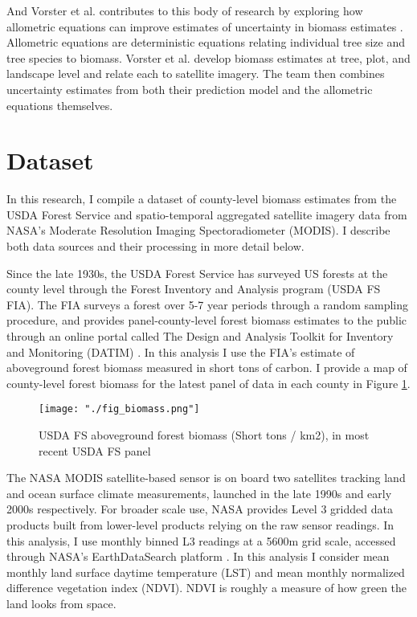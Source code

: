 \documentclass{article}
\begin{document}
And Vorster et al. contributes to this body of research by exploring how allometric equations can improve estimates of uncertainty in biomass estimates \cite{Vorster_2020}. Allometric equations are deterministic equations relating individual tree size and tree species to biomass. Vorster et al. develop biomass estimates at tree, plot, and landscape level and relate each to satellite imagery. The team then combines uncertainty estimates from both their prediction model and the allometric equations themselves. 

\section{Dataset}
\label{sec:data}

In this research, I compile a dataset of county-level biomass estimates from the USDA Forest Service and spatio-temporal aggregated satellite imagery data from NASA's Moderate Resolution Imaging Spectoradiometer (MODIS). I describe both data sources and their processing in more detail below. 

Since the late 1930s, the USDA Forest Service has surveyed US forests at the county level through the Forest Inventory and Analysis program (USDA FS FIA). The FIA surveys a forest over 5-7 year periods through a random sampling procedure, and provides panel-county-level forest biomass estimates to the public through an online portal called The Design and Analysis Toolkit for Inventory and Monitoring (DATIM) \cite{DATIM}. In this analysis I use the FIA's estimate of aboveground forest biomass measured in short tons of carbon. I provide a map of county-level forest biomass for the latest panel of data in each county in Figure \ref{fig:biomass}.

\begin{figure}[!htbp]
  \centering
  \texttt{[image: "./fig\_biomass.png"]}
  \caption{\label{fig:biomass} USDA FS aboveground forest biomass (Short tons / km2), in most recent USDA FS panel}
\end{figure}

The NASA MODIS satellite-based sensor is on board two satellites tracking land and ocean surface climate measurements, launched in the late 1990s and early 2000s respectively. For broader scale use, NASA provides Level 3 gridded data products built from lower-level products relying on the raw sensor readings. In this analysis, I use monthly binned L3 readings at a 5600m grid scale, accessed through NASA's EarthDataSearch platform \cite{modis_ndvi} \cite{modis_lst}. In this analysis I consider mean monthly land surface daytime temperature (LST) and mean monthly normalized difference vegetation index (NDVI). NDVI is roughly a measure of how green the land looks from space.
\end{document}
